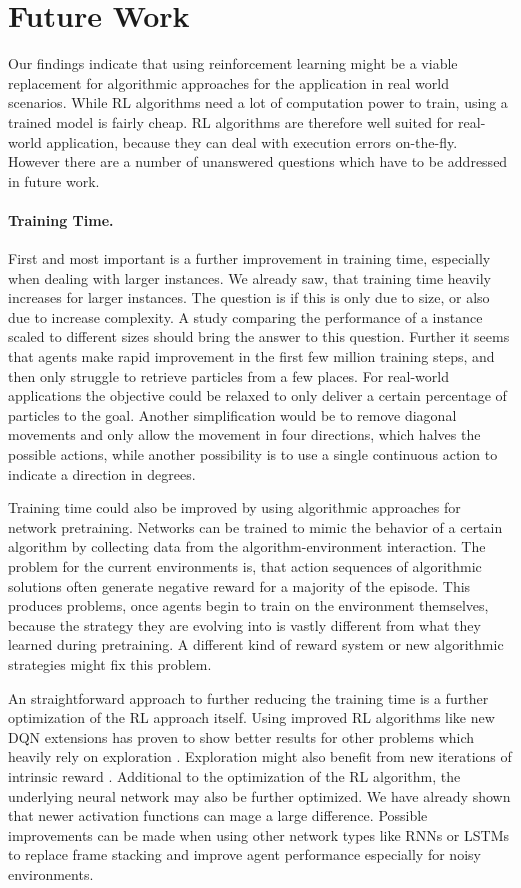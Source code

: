 \section{Future Work} \label{sec:FutureWork}
Our findings indicate that using reinforcement learning might be a viable replacement for algorithmic approaches for the application in real world scenarios. While RL algorithms need a lot of computation power to train, using a trained model is fairly cheap. RL algorithms are therefore well suited for real-world application, because they can deal with execution errors on-the-fly. However there are a number of unanswered questions which have to be addressed in future work.

\paragraph{Training Time.}
First and most important is a further improvement in training time, especially when dealing with larger instances. We already saw, that training time heavily increases for larger instances. The question is if this is only due to size, or also due to increase complexity. A study comparing the performance of a instance scaled to different sizes should bring the answer to this question. Further it seems that agents make rapid improvement in the first few million training steps, and then only struggle to retrieve particles from a few places. For real-world applications the objective could be relaxed to only deliver a certain percentage of particles to the goal. Another simplification would be to remove diagonal movements and only allow the movement in four directions, which halves the possible actions, while another possibility is to use a single continuous action to indicate a direction in degrees.

Training time could also be improved by using algorithmic approaches for network pretraining. Networks can be trained to mimic the behavior of a certain algorithm by collecting data from the algorithm-environment interaction. The problem for the current environments is, that action sequences of algorithmic solutions often generate negative reward for a majority of the episode. This produces problems, once agents begin to train on the environment themselves, because the strategy they are evolving into is vastly different from what they learned during pretraining. A different kind of reward system or new algorithmic strategies might fix this problem.

An straightforward approach to further reducing the training time is a further optimization of the RL approach itself. Using improved RL algorithms like new DQN extensions has proven to show better results for other problems which heavily rely on exploration \cite{badia2020agent57}. Exploration might also benefit from new iterations of intrinsic reward \cite{badia2020never}. Additional to the optimization of the RL algorithm, the underlying neural network may also be further optimized. We have already shown that newer activation functions can mage a large difference. Possible improvements can be made when using other network types like RNNs or LSTMs to replace frame stacking and improve agent performance especially for noisy environments.

